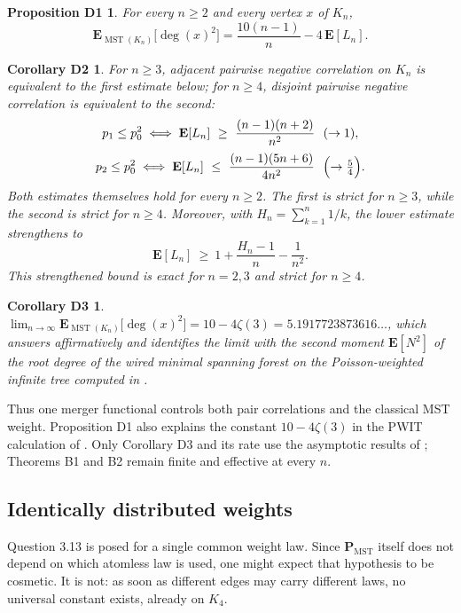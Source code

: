 \documentclass[10pt,a4paper]{amsart}
\newtheorem*{theoremD1}{Proposition D1}
\newtheorem*{theoremD2}{Corollary D2}
\newtheorem*{theoremD3}{Corollary D3}
\newcommand{\MST}{\operatorname{MST}}
\newcommand{\PMST}{\mathbf{P}_{\mathrm{MST}}}
\newcommand{\E}{\mathbf{E}}
\DeclareMathOperator{\dg}{deg}
\begin{document}
\begin{theoremD1}
For every $n\ge2$ and every vertex $x$ of $K_n$,
\[
\E_{\MST(K_n)}\bigl[\dg(x)^2\bigr]=\frac{10(n-1)}{n}-4\,\E[L_n].
\]
\end{theoremD1}

\begin{theoremD2}
For $n\ge3$, adjacent pairwise negative correlation on $K_n$ is equivalent to
the first estimate below; for $n\ge4$, disjoint pairwise negative correlation is
equivalent to the second:
\begin{gather*}
p_1\le p_0^2\iff \E[L_n]\ \ge\ \frac{(n-1)(n+2)}{n^2}\ \ (\to1),\\[2pt]
p_2\le p_0^2\iff \E[L_n]\ \le\ \frac{(n-1)(5n+6)}{4n^2}\ \ \Bigl(\to\tfrac54\Bigr).
\end{gather*}
Both estimates themselves hold for every $n\ge2$. The first is strict for
$n\ge3$, while the second is strict for $n\ge4$.
Moreover, with $H_n=\sum_{k=1}^n1/k$, the lower estimate strengthens to
\[
\E[L_n]\ \ge\ 1+\frac{H_n-1}{n}-\frac1{n^2}.
\]
This strengthened bound is exact for $n=2,3$ and strict for $n\ge4$.
\end{theoremD2}

\begin{theoremD3}
$\displaystyle\lim_{n\to\infty}\E_{\MST(K_n)}\bigl[\dg(x)^2\bigr]=10-4\zeta(3)
=5.1917723873616\ldots$, which answers \cite[Question 3.8]{TZ} affirmatively and
identifies the limit with the second moment $\E[N^2]$ of the root degree of the
wired minimal spanning forest on the Poisson-weighted infinite tree computed in
\cite[Proposition 3.11]{TZ}.
\end{theoremD3}

Thus one merger functional controls both pair correlations and the classical
MST weight. Proposition D1 also explains the constant $10-4\zeta(3)$ in the
PWIT calculation of \cite{TZ}. Only Corollary D3 and its rate use the
asymptotic results of \cite{CFIJS,LiZhang}; Theorems B1 and B2 remain finite
and effective at every $n$.

\subsection{Identically distributed weights}
\label{ssec:introC}

Question 3.13 is posed for a single common weight law. Since $\PMST$ itself does
not depend on which atomless law is used, one might expect that hypothesis to be
cosmetic. It is not: as soon as different edges may carry different laws, no
universal constant exists, already on $K_4$.
\end{document}
